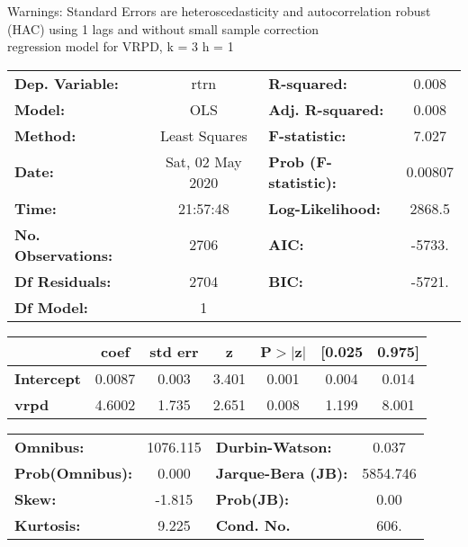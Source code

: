 Warnings: \newline
 [1] Standard Errors are heteroscedasticity and autocorrelation robust (HAC) using 1 lags and without small sample correction\\ 

regression model for VRPD, k = 3 h = 1\begin{center}
\begin{tabular}{lclc}
\toprule
\textbf{Dep. Variable:}    &       rtrn       & \textbf{  R-squared:         } &     0.008   \\
\textbf{Model:}            &       OLS        & \textbf{  Adj. R-squared:    } &     0.008   \\
\textbf{Method:}           &  Least Squares   & \textbf{  F-statistic:       } &     7.027   \\
\textbf{Date:}             & Sat, 02 May 2020 & \textbf{  Prob (F-statistic):} &  0.00807    \\
\textbf{Time:}             &     21:57:48     & \textbf{  Log-Likelihood:    } &    2868.5   \\
\textbf{No. Observations:} &        2706      & \textbf{  AIC:               } &    -5733.   \\
\textbf{Df Residuals:}     &        2704      & \textbf{  BIC:               } &    -5721.   \\
\textbf{Df Model:}         &           1      & \textbf{                     } &             \\
\bottomrule
\end{tabular}
\begin{tabular}{lcccccc}
                   & \textbf{coef} & \textbf{std err} & \textbf{z} & \textbf{P$> |$z$|$} & \textbf{[0.025} & \textbf{0.975]}  \\
\midrule
\textbf{Intercept} &       0.0087  &        0.003     &     3.401  &         0.001        &        0.004    &        0.014     \\
\textbf{vrpd}      &       4.6002  &        1.735     &     2.651  &         0.008        &        1.199    &        8.001     \\
\bottomrule
\end{tabular}
\begin{tabular}{lclc}
\textbf{Omnibus:}       & 1076.115 & \textbf{  Durbin-Watson:     } &    0.037  \\
\textbf{Prob(Omnibus):} &   0.000  & \textbf{  Jarque-Bera (JB):  } & 5854.746  \\
\textbf{Skew:}          &  -1.815  & \textbf{  Prob(JB):          } &     0.00  \\
\textbf{Kurtosis:}      &   9.225  & \textbf{  Cond. No.          } &     606.  \\
\bottomrule
\end{tabular}
\end{center}

